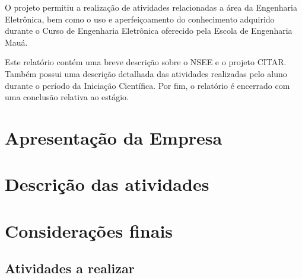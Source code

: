 \documentclass[
	12pt,				%
	openright,			%
	twoside,			%
	a4paper,			%
	english,			%
	french,				%
	spanish,			%
	brazil				%
	]{abntex2}
\begin{document}
	O projeto permitiu a realização de atividades relacionadas a área da Engenharia Eletrônica, bem como o uso e aperfeiçoamento do conhecimento adquirido durante o Curso de Engenharia Eletrônica oferecido pela Escola de Engenharia Mauá.
	
	Este relatório contém uma breve descrição sobre o NSEE e o projeto CITAR. Também possui uma descrição detalhada das atividades realizadas pelo aluno durante o período da Iniciação Científica. Por fim, o relatório é encerrado com uma conclusão relativa ao estágio.
	

\part{Apresentação da Empresa}





%

\part{Descrição das atividades}



\part{Considerações finais}

\chapter{Atividades a realizar}
\end{document}
